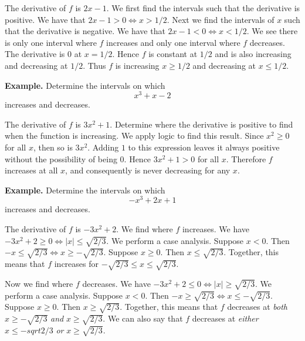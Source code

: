 The derivative of $f$ is $2x - 1$. We first find the intervals such that the derivative is positive. We have that $2x - 1 > 0 \Leftrightarrow x > 1/2$. Next we find the intervals of $x$ such that the derivative is negative. We have that $2x - 1 < 0 \Leftrightarrow x < 1/2$. We see there is only one interval where $f$ increases and only one interval where $f$ decreases. The derivative is $0$ at $x = 1/2$. Hence $f$ is constant at $1/2$ and is also increasing and decreasing at $1/2$. Thus $f$ is increasing $x \ge 1/2$ and decreasing at $x \le 1/2$.

\textbf{Example.} Determine the intervals on which
\[x^3 + x - 2\]
increases and decreases.

The derivative of $f$ is $3x^2 + 1$. Determine where the derivative is positive to find when the function is increasing. We apply logic to find this result. Since $x^2 \ge 0$ for all $x$, then so is $3x^2$. Adding $1$ to this expression leaves it always positive without the possibility of being $0$. Hence $3x^2 + 1 > 0$ for all $x$. Therefore $f$ increases at all $x$, and consequently is never decreasing for any $x$.

\textbf{Example.} Determine the intervals on which
\[-x^3 + 2x + 1\]
increases and decreases.

The derivative of $f$ is $-3x^2 + 2$. We find where $f$ increases. We have $-3x^2 + 2 \ge 0 \Leftrightarrow |x| \le \sqrt{2/3}$. We perform a case analysis. Suppose $x < 0$. Then $-x \le \sqrt{2/3} \Leftrightarrow x \ge -\sqrt{2/3}$. Suppose $x \ge 0$. Then $x \le \sqrt{2/3}$. Together, this means that $f$ increases for $-\sqrt{2/3} \le x \le \sqrt{2/3}$.

Now we find where $f$ decreases. We have $-3x^2 + 2 \le 0 \Leftrightarrow |x| \ge \sqrt{2/3}$. We perform a case analysis. Suppose $x < 0$. Then $-x \ge \sqrt{2/3} \Leftrightarrow x \le -\sqrt{2/3}$. Suppose $x \ge 0$. Then $x \ge \sqrt{2/3}$. Together, this means that $f$ decreases at \textit{both} $x \ge -\sqrt{2/3}$ \textit{and} $x \ge \sqrt{2/3}$. We can also say that $f$ decreases at \textit{either} $x \le -sqrt{2/3}$ \textit{or} $x \ge \sqrt{2/3}$.
